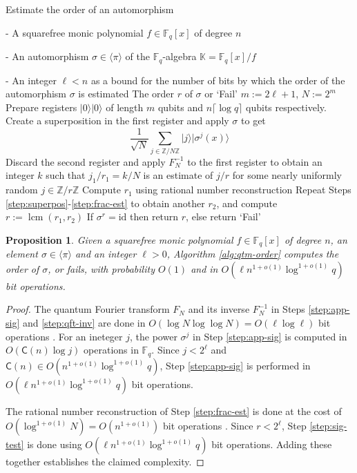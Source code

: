 \documentclass{article}
\theoremstyle{plain}
\newtheorem{proposition}[theorem]{Proposition}
\theoremstyle{definition}
\newcommand{\algbox}[1]{
	\begin{tcolorbox}[width = 0.8\textwidth, colback = white, arc = 2pt, boxrule = 0.5pt] 
		#1 
	\end{tcolorbox}
}
\newcommand{\lrang}[1]{\langle#1\rangle}
\newcommand{\ldbrac}[1]{\lvert#1\rangle}
\DeclareMathOperator{\lcm}{lcm} %
\def\K{\ensuremath{\mathbb{K}}}
\def\Z{\ensuremath{\mathbb{Z}}}
\def\F{\ensuremath{\mathbb{F}}}
\def\CC{\ensuremath{\mathsf{C}}}
\begin{document}
\begin{algorithm}[t]
	\caption{Estimate the order of an automorphism}
	\label{alg:qtm-order}
	\centering
	\algbox{
	\begin{algorithmic}[1]
		\Require 
		\item[-] A squarefree monic polynomial $f \in \F_q[x]$ of degree $n$
		\item[-] An automorphism $\sigma \in \lrang{\pi}$ of the $\F_q$-algebra $\K = \F_q[x] / f$
		\item[-] An integer $\ell < n$ as a bound for the number of bits by which the order of the 
		automorphism $\sigma$ is estimated
		\Ensure The order $r$ of $\sigma$ or `Fail'
		\State $m := 2\ell + 1$, $N := 2^m$
		\State\label{step:superpos}Prepare registers $\ldbrac{0}\ldbrac{0}$ of length $m$ qubits 
		and $n\lceil \log q \rceil$ qubits respectively.
		\State\label{step:app-sig}Create a superposition in the first register and apply $\sigma$ 
		to get
		\[ \frac{1}{\sqrt{N}} \sum_{j \in \Z/N\Z} \ldbrac{j}\ldbrac{\sigma^j(x)} \]
		\State\label{step:qft-inv}Discard the second register and apply $F_N^{-1}$ to the first 
		register to obtain an integer $k$ such that $j_1 / r_1 = k / N$ is an estimate of $j / r$ 
		for some nearly uniformly random $j \in \Z/r\Z$
		\State\label{step:frac-est}Compute $r_1$ using rational number reconstruction
		\State Repeat Steps \ref{step:superpos}-\ref{step:frac-est} to obtain another $r_2$, 
		and compute $r := \lcm(r_1, r_2)$
		\State\label{step:sig-test} If $\sigma^r = \text{id}$ then return $r$, else return `Fail'
	\end{algorithmic}}
\end{algorithm}
	
\begin{proposition}
	Given a squarefree monic polynomial $f \in \F_q[x]$ of degree $n$, an element $\sigma \in 
	\lrang{\pi}$ and an integer $\ell > 0$, Algorithm \ref{alg:qtm-order} computes the order of 
	$\sigma$, or fails, with probability $O(1)$ and in $O(\ell n^{1 + o(1)}\log^{1 + o(1)}q)$ bit 
	operations.
\end{proposition}
\begin{proof}
	The quantum Fourier transform $F_N$ and its inverse $F_N^{-1}$ in Steps \ref{step:app-sig} 
	and \ref{step:qft-inv} are done in $O(\log N \log\log N) = O(\ell\log\ell)$ bit operations 
	\cite{cleve1998quantum, childs2010quantum}. For an ineteger $j$, the power $\sigma^j$ in Step 
	\ref{step:app-sig} is computed in $O(\CC(n)\log j)$ operations in $\F_q$. Since $j < 2^\ell$ 
	and $\CC(n) \in O(n^{1 + o(1)}\log^{1 + o(1)}q)$, Step \ref{step:app-sig} is performed in 
	$O(\ell n^{1 + o(1)}\log^{1 + o(1)}q)$ bit operations.
	
	The rational number reconstruction of Step \ref{step:frac-est} is done at the cost of 
	$O(\log^{1 + o(1)}N) = O(n^{1 + o(1)})$ bit operations \cite{pan2002acceleration}. Since $r < 
	2^\ell$, Step \ref{step:sig-test} is done using $O(\ell n^{1 + o(1)}\log^{1 + o(1)}q)$ bit 
	operations. Adding these together establishes the claimed complexity.
\end{proof}
\end{document}
